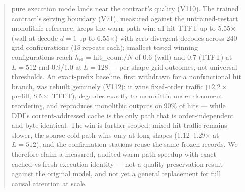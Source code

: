 \documentclass[10pt]{article}
\begin{document}
\begin{abstract}
pure execution mode lands near the contract's quality (V110). The trained
contract's serving boundary (V71), measured against the untrained-restart
monolithic reference, keeps the warm-path win: all-hit TTFT up to
5.55$\times$ (wall at decode $d{=}1$ up to 6.55$\times$) with zero divergent
decodes across 240 grid configurations (15 repeats each); smallest tested
winning configurations reach $h_{\mathrm{eff}}{=}$hit\_count$/N$ of 0.6
(wall) and 0.7 (TTFT) at $L{=}512$ and 0.9/1.0 at $L{=}128$ --- per-shape
grid outcomes, not universal thresholds. An exact-prefix baseline, first
withdrawn for a nonfunctional hit branch, was rebuilt genuinely (V112): it
wins fixed-order traffic ($12.2\times$ prefill, $8.5\times$ TTFT), degrades
exactly to monolithic under document reordering, and reproduces monolithic
outputs on 90\% of hits --- while DDI's content-addressed cache is the only
path that is order-independent and byte-identical.
The win is further scoped: mixed-hit traffic remains slower, the sparse cold
path wins only at long shapes (1.12--1.29$\times$ at $L{=}512$), and the
confirmation stations reuse the same frozen records. We therefore claim a
measured, audited warm-path speedup with exact cached-vs-fresh execution
identity --- not a quality-preservation result against the original model,
and not yet a general replacement for full causal attention at scale.
\end{abstract}





\clearpage
\appendix

\end{document}
